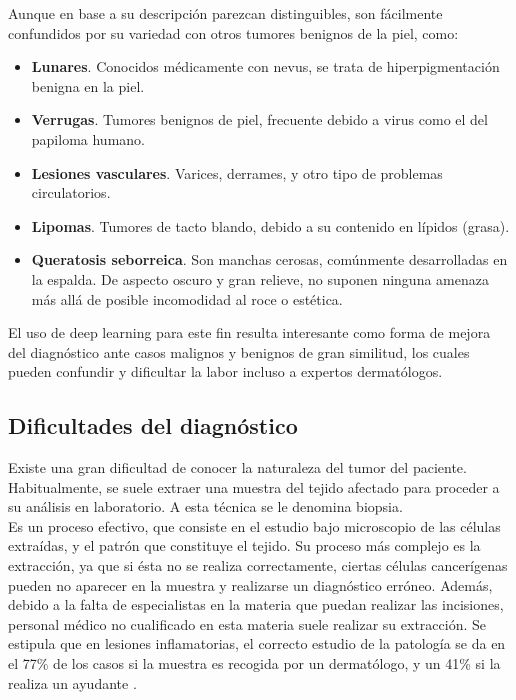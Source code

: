 Aunque en base a su descripción parezcan distinguibles, son fácilmente confundidos por su variedad con otros tumores benignos de la piel, como:

\begin{itemize}
	\item \textbf{Lunares}. Conocidos médicamente con nevus, se trata de hiperpigmentación benigna en la piel.
	\item \textbf{Verrugas}. Tumores benignos de piel, frecuente debido a virus como el del papiloma humano.
	\item \textbf{Lesiones vasculares}. Varices, derrames, y otro tipo de problemas circulatorios.
	\item \textbf{Lipomas}. Tumores de tacto blando, debido a su contenido en lípidos (grasa).
	\item \textbf{Queratosis seborreica}. Son manchas cerosas, comúnmente desarrolladas en la espalda. De aspecto oscuro y gran relieve, no suponen ninguna amenaza más allá de posible incomodidad al roce o estética.
\end{itemize}

El uso de deep learning para este fin resulta interesante como forma de mejora del diagnóstico ante casos malignos y benignos de gran similitud, los cuales pueden confundir y dificultar la labor incluso a expertos dermatólogos.

\subsection{Dificultades del diagnóstico}

Existe una gran dificultad de conocer la naturaleza del tumor del paciente. Habitualmente, se suele extraer una muestra del tejido afectado para proceder a su análisis en laboratorio. A esta técnica se le denomina biopsia.\\

Es un proceso efectivo, que consiste en el estudio bajo microscopio de las células extraídas, y el patrón que constituye el tejido. Su proceso más complejo es la extracción, ya que si ésta no se realiza correctamente, ciertas células cancerígenas pueden no aparecer en la muestra y realizarse un diagnóstico erróneo. Además, debido a la falta de especialistas en la materia que puedan realizar las incisiones, personal médico no cualificado en esta materia suele realizar su extracción. Se estipula que en lesiones inflamatorias, el correcto estudio de la patología se da en el 77\% de los casos si la muestra es recogida por un dermatólogo, y un 41\% si la realiza un ayudante \cite{LLAMASVELASCO201212}.\\

